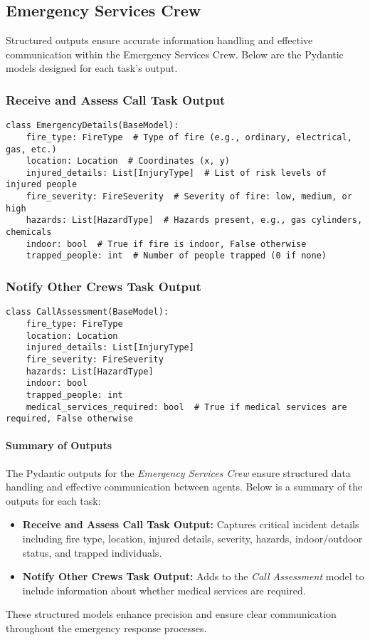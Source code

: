 \subsection{Emergency Services Crew}

Structured outputs ensure accurate information handling and effective communication within the Emergency Services Crew. Below 
are the Pydantic models designed for each task's output.


\subsubsection{Receive and Assess Call Task Output}

\begin{lstlisting}[caption={Pydantic model for Receive and Assess Call Task Output}] 
class EmergencyDetails(BaseModel):
    fire_type: FireType  # Type of fire (e.g., ordinary, electrical, gas, etc.)
    location: Location  # Coordinates (x, y)
    injured_details: List[InjuryType]  # List of risk levels of injured people
    fire_severity: FireSeverity  # Severity of fire: low, medium, or high
    hazards: List[HazardType]  # Hazards present, e.g., gas cylinders, chemicals
    indoor: bool  # True if fire is indoor, False otherwise
    trapped_people: int  # Number of people trapped (0 if none)
\end{lstlisting}

\subsubsection{Notify Other Crews Task Output}

\begin{lstlisting}[caption={Pydantic model for Notify Other Crews Task Output}] 
class CallAssessment(BaseModel):
    fire_type: FireType
    location: Location
    injured_details: List[InjuryType]
    fire_severity: FireSeverity
    hazards: List[HazardType]
    indoor: bool
    trapped_people: int
    medical_services_required: bool  # True if medical services are required, False otherwise
\end{lstlisting}

\paragraph{Summary of Outputs}
The Pydantic outputs for the \textit{Emergency Services Crew} ensure structured data handling and effective communication between agents. Below is a summary of the outputs for each task:

\begin{itemize}
    \item \textbf{Receive and Assess Call Task Output:} Captures critical incident details including fire type, location, injured details, severity, hazards, indoor/outdoor status, and trapped individuals.
    \item \textbf{Notify Other Crews Task Output:} Adds to the \textit{Call Assessment} model to include information about 
    whether medical services are required.
\end{itemize}

These structured models enhance precision and ensure clear communication throughout the emergency response processes.
    